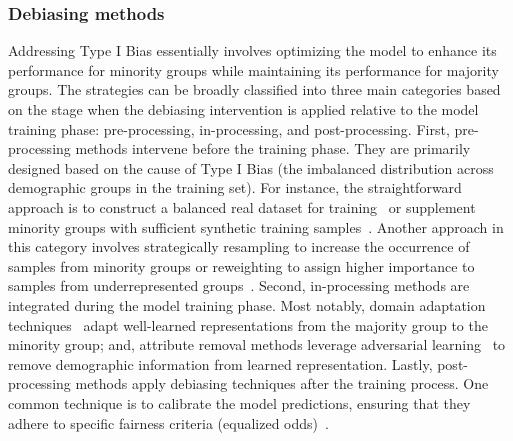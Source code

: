 \subsubsection{Debiasing methods}
Addressing Type I Bias essentially involves optimizing the model to enhance its performance for minority groups while maintaining its performance for majority groups.
The strategies can be broadly classified into three main categories based on the stage when the debiasing intervention is applied relative to the model training phase: pre-processing, in-processing, and post-processing.
First, pre-processing methods intervene before the training phase. 
They are primarily designed based on the cause of Type I Bias (the imbalanced distribution across demographic groups in the training set).
For instance, the straightforward approach is to construct a balanced real dataset for training~\cite{Fairface} or supplement minority groups with sufficient synthetic training samples~\cite{CAT}.
Another approach in this category involves strategically resampling to increase the occurrence of samples from minority groups or reweighting to assign higher importance to samples from underrepresented groups~\cite{RL_RBN}.
Second, in-processing methods are integrated during the model training phase.
Most notably, domain adaptation techniques~\cite{BAE,MFR} adapt well-learned representations from the majority group to the minority group; and, attribute removal methods leverage adversarial learning~\cite{DebFace,pass} to remove demographic information from learned representation.
Lastly, post-processing methods apply debiasing techniques after the training process.
One common technique is to calibrate the model predictions, ensuring that they adhere to specific fairness criteria (\eg equalized odds)~\cite{calibrated_Eodds}. 















